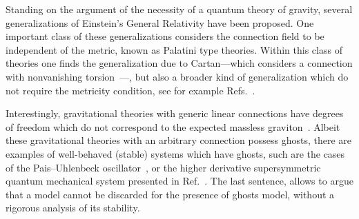 \documentclass[aps,prd,12pt,twocolumn,superscriptaddress,showpacs,showkeys,reprint%
]{revtex4-1}
\renewcommand{\(}{\left(}
\renewcommand{\)}{\right)}
\renewcommand{\[}{\left[}
\renewcommand{\]}{\right]}
\begin{document}

Standing on the argument of the necessity of a quantum theory of gravity, several generalizations of Einstein's General Relativity have been proposed. One important class of these generalizations considers the connection field to be independent of the metric, known as Palatini type theories. Within this class of theories one finds the generalization due to Cartan---which considers a connection with nonvanishing torsion~\cite{Cartan1922,Cartan1923,Cartan1924,Cartan1925}---, but also a broader kind of generalization which do not require the metricity condition, see for example Refs.~\cite{Hehl:1976kj,Hehl:1994ue,Pagani:2015ema}.

Interestingly, gravitational theories with generic linear connections have degrees of freedom which do not correspond to the expected massless graviton~\cite{Sezgin:1979zf}. Albeit these gravitational theories with an arbitrary connection possess ghosts, there are examples of well-behaved (stable) systems which have ghosts, such are the cases of the Pais--Uhlenbeck oscillator~\cite{Mannheim:2004qz,Bender:2007wu,Smilga:2008pr,Ilhan:2013xe}, or the higher derivative supersymmetric quantum mechanical system presented in Ref.~\cite{Robert:2008}. The last sentence, allows to argue that a model cannot be discarded  for the presence of ghosts model, without a rigorous analysis of its stability.
\end{document}
